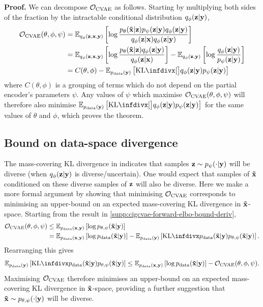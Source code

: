 \textbf{Proof.} We can decompose ${\mathcal{O}}_\text{CVAE}$ as follows.
Starting by multiplying both sides of the fraction by the intractable
conditional distribution $q_\phi({\mathbf{z}}|{\mathbf{y}})$,
\begin{align}
  \gO_\text{CVAE}(\theta, \phi, \psi ) &= \EX_{q_\phi(\rvz,\rvx,\rvy)} \left[ \log \frac{p_\theta(\tildeI{}|\rvz)p_\psi(\rvz|\rvy)q_\phi(\rvz|\rvy)}{q_\phi(\rvz|\rvx)q_\phi(\rvz|\rvy)} \right]\\
                                                   &= \EX_{q_\phi(\rvz,\rvx,\rvy)} \left[ \log \frac{p_\theta(\tildeI{}|\rvz)q_\phi(\rvz|\rvy)}{q_\phi(\rvz|\rvx)} \right] - \EX_{q_\phi(\rvz,\rvy)} \left[ \log\frac{q_\phi(\rvz|\rvy)}{p_\psi(\rvz|\rvy)} \right] \\
                                                   &= C(\theta, \phi) - \EX_{\pdata (\rvy)} \left[ \kl[\big]{ q_\phi(\rvz|\rvy) }{ p_\psi(\rvz|\rvy) } \right]   \label{eq:constant-and-forward-kl}
\end{align}
where $C(\theta, \phi)$ is a grouping of terms which do not depend on the
partial encoder's parameters $\psi $. Any values of $\psi$ which
maximise ${\mathcal{O}}_\text{CVAE}(\theta, \phi, \psi)$ will therefore also
minimise $\EX_{\pdata (\rvy)} \left[ \kl[\big]{ q_\phi(\rvz|\rvy) }{p_\psi(\rvz|\rvy) } \right]$ for the same values of $\theta$ and $\phi$,
which proves the theorem.

\subsection{Bound on data-space divergence}
The mass-covering KL divergence in  indicates that
samples ${\mathbf{z}}\sim p_\psi(\cdot|{\mathbf{y}})$ will be diverse (when $q_\phi({\mathbf{z}}|{\mathbf{y}})$ is
diverse/uncertain). One would expect that samples of $\mathbf{\tilde{x}}{}$ conditioned on these
diverse samples of ${\mathbf{z}}$ will also be diverse. Here we make a more formal argument
by showing that minimising ${\mathcal{O}}_\text{CVAE}$ corresponds to minimising
an upper-bound on an expected mass-covering KL divergence in $\mathbf{\tilde{x}}{}$-space.
Starting from the result in \cref{supp:cigcvae-forward-elbo-bound-deriv},
\begin{align}
  \gO_\text{CVAE}(\theta, \phi, \psi ) &\leq \EX_{\pdata (\rvx,\rvy)} \left[ \log p_{\theta,\psi}(\tildeI{}|\rvy) \right] \\
                                                     &= \EX_{\pdata (\rvx,\rvy)} \left[ \log \pdata (\tildeI{}|\rvy) \right] - \EX_{\pdata (\rvy)}\left[ \kl{\pdata (\tildeI{}|\rvy)}{p_{\theta,\psi}(\tildeI{}|\rvy)} \right].
\end{align}
Rearranging this gives
\begin{align}
  \EX_{\pdata (\rvy)}\left[ \kl{\pdata (\tildeI{}|\rvy)}{p_{\theta,\psi}(\tildeI{}|\rvy)} \right]  \leq \EX_{\pdata (\rvx,\rvy)} \left[ \log \pdata (\tildeI{}|\rvy) \right] - \gO_\text{CVAE}(\theta, \phi, \psi ).
\end{align}
Maximising ${\mathcal{O}}_\text{CVAE}$ therefore minimises an upper-bound on an
expected mass-covering KL divergence in $\mathbf{\tilde{x}}{}$-space, providing a further suggestion that
$\mathbf{\tilde{x}}{}\sim p_{\theta,\psi}(\cdot|{\mathbf{y}})$ will be diverse.

